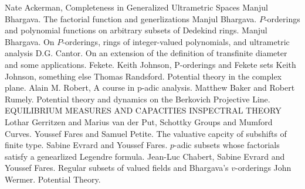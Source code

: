 \documentclass[12pt]{dalthesis}
\theoremstyle{plain}
\theoremstyle{definition}
\begin{document}
\begin{thebibliography}{9}
 Nate Ackerman,  Completeness in Generalized Ultrametric Spaces
 Manjul Bhargava. The factorial function and generlizations
 Manjul Bhargava. $P$-orderings and polynomial functions on arbitrary subsets of Dedekind rings.
 Manjul Bhargava. On $ P$-orderings, rings of integer-valued polynomials, and ultrametric analysis
  D.G. Cantor. On an extension of the definition of transfinite diameter and some applications.  
 Fekete.
 Keith Johnson, P-orderings and Fekete sets
 Keith Johnson, something else
 Thomas Randsford. Potential theory in the complex plane.
 Alain M. Robert, A course in p-adic analysis.
 Matthew Baker and Robert Rumely. Potential theory and dynamics on the Berkovich Projective Line.
 EQUILIBRIUM MEASURES AND CAPACITIES INSPECTRAL THEORY
 Lothar Gerritzen and Marius van der Put, Schottky Groups and Mumford Curves.
 Youssef Fares and Samuel Petite. The valuative capcity of subshifts of finite type.
 Sabine Evrard and Youssef Fares. $p$-adic subsets whose factorials satisfy a genearlized Legendre formula.
 Jean-Luc Chabert, Sabine Evrard and Youssef Fares. Regular subsets of valued fields and Bhargava’s $v$-orderings
 John Wermer. Potential Theory.
\end{thebibliography}
\end{document}
